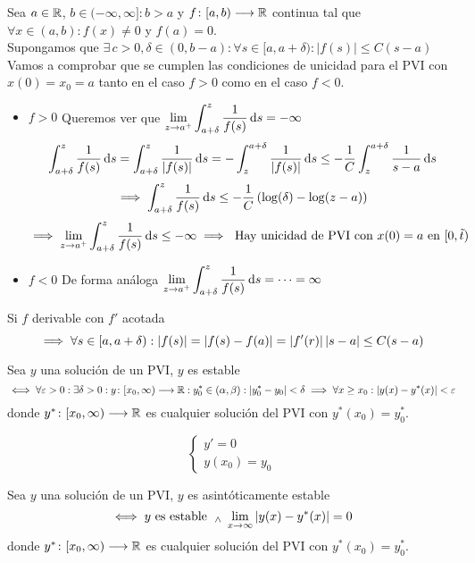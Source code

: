 \begin{obs}
	Sea $a\in \mathbb{R}$, $b \in (-\infty, \infty] : b>a$ y $f \colon [a,b) \longrightarrow \mathbb{R}$ continua tal que $\forall x \in (a,b) : f(x)\ne 0$ y $f(a)=0$. \\
	Supongamos que $\exists\, c >0, \delta \in (0, b-a) : \forall s \in [a, a+\delta) : |f(s)|\leq C(s -a)$ \\
	Vamos a comprobar que se cumplen las condiciones de unicidad para el PVI con $x(0)=x_0=a$ tanto en el caso $f>0$ como en el caso $f<0$.
	\begin{itemize}
		\item $\boxed{f>0}$ Queremos ver que $\ds \lim_{z\to a^+}\int_{a+\delta}^{z} \frac{1}{f(s)}\odif{s} = -\infty$
		\[\int_{a+\delta}^{z} \frac{1}{f(s)}\odif{s} = \int_{a+\delta}^{z} \frac{1}{\abs{f(s)}}\odif{s}=-\int_{z}^{a+\delta} \frac{1}{\abs{f(s)}}\odif{s} \leq -\frac{1}{C} \int_{z}^{a+\delta} \frac{1}{s-a}\odif{s}\]
		\[\implies \int_{a+\delta}^{z} \frac{1}{f(s)}\odif{s} \leq -\frac{1}{C}\left(\log(\delta)-\log(z-a)\right)\]
		\[\implies \lim_{z\to a^+}\int_{a+\delta}^{z} \frac{1}{f(s)}\odif{s} \leq -\infty \implies \tex{ Hay unicidad de PVI con }x(0)=a \tex{ en } [0, \tilde{t})\]
		\item $\boxed{f<0}$ De forma análoga $\ds \lim_{z\to a^+}\int_{a+\delta}^{z} \frac{1}{f(s)}\odif{s} = \cdots = \infty$
	\end{itemize}
	Si $f$ derivable con $f'$ acotada
	\[\implies \forall s \in [a, a+\delta) : \left|f(s)\right|=\left|f(s)-f(a)\right|=\left|f'(r)\right|\left|s-a\right|\leq C(s-a)\]
\end{obs}



\begin{defn}[Estabilidad]
	Sea $y$ una solución de un PVI, $y$ es estable
	\[\iff \forall \varepsilon >0 : \exists \delta > 0 : y \colon [x_0, \infty) \longrightarrow \mathbb{R} : y_0^*\in (\alpha, \beta) : \left|y_0^*-y_0\right| < \delta \implies \forall x \geq x_0 :\left|y(x)-y^*(x)\right|<\varepsilon\]
	donde $y^* \colon [x_0, \infty) \longrightarrow \mathbb{R}$ es cualquier solución del PVI con $y^*(x_0)=y_0^*$.
\end{defn}

\begin{ejem}
	\[\begin{cases}
		y'=0 \\
		y(x_0)=y_0
	\end{cases}\]
\end{ejem}

\begin{defn}
	Sea $y$ una solución de un PVI, $y$ es asintóticamente estable
	\[\iff y \text{ es estable } \; _{\wedge} \; \lim_{x\to \infty}\left|y(x)-y^*(x)\right|=0\]
	donde $y^* \colon [x_0, \infty) \longrightarrow \mathbb{R}$ es cualquier solución del PVI con $y^*(x_0)=y_0^*$.
\end{defn}

